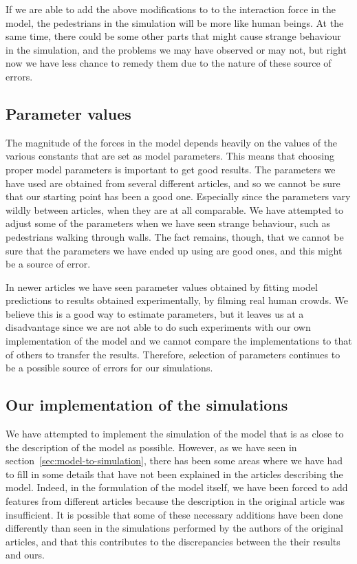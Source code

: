 If we are able to add the above modifications to to the interaction force in 
the model, the pedestrians in the simulation will be more like human beings. 
At the same time, there could be some other parts that might cause strange 
behaviour in the simulation, and the problems we may have observed or may not, 
but right now we have less chance to remedy them due to the nature of these 
source of errors.

\subsection{Parameter values}
The magnitude of the forces in the model depends heavily on the values of the 
various constants that are set as model parameters. This means that choosing 
proper model parameters is important to get good results. The parameters we have 
used are obtained from several different articles, and so we cannot be sure 
that our starting point has been a good one. Especially since the parameters 
vary wildly between articles, when they are at all comparable. We have 
attempted to adjust some of the parameters when we have seen strange 
behaviour, such as pedestrians walking through walls. The fact remains, 
though, that we cannot be sure that the parameters we have ended up using are 
good ones, and this might be a source of error.

In newer articles we have seen parameter values obtained by fitting model 
predictions to results obtained experimentally, by filming real human crowds.  
We believe this is a good way to estimate parameters, but it leaves us at a 
disadvantage since we are not able to do such experiments with our own 
implementation of the model and we cannot compare the implementations to that 
of others to transfer the results. Therefore, selection of parameters 
continues to be a possible source of errors for our simulations.

\subsection{Our implementation of the simulations}
\label{sec:random-errors}
We have attempted to implement the simulation of the model that is as close to 
the description of the model as possible. However, as we have seen in 
section~\ref{sec:model-to-simulation}, there has been some areas where we have 
had to fill in some details that have not been explained in the articles 
describing the model. Indeed, in the formulation of the model itself, we have 
been forced to add features from different articles because the description in 
the original article was insufficient. It is possible that some of these 
necessary additions have been done differently than seen in the simulations 
performed by the authors of the original articles, and that this contributes 
to the discrepancies between the their results and ours.

